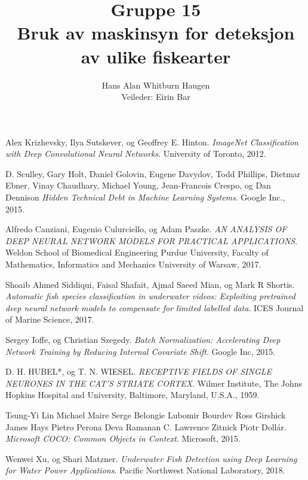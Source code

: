 \documentclass[11ot]{article}
\title{Gruppe 15\\Bruk av maskinsyn for deteksjon av ulike fiskearter}
\author{Hans Alan Whitburn Haugen\\Veileder: Eirin Bar}
\begin{document}

\newpage

\newpage

\newpage

\tableofcontents
\clearpage
{}
\setcounter{page}{1}








\begin{thebibliography}{9}


Alex Krizhevsky, Ilya Sutskever, og Geoffrey E. Hinton. 
\textit{ImageNet Classification with Deep Convolutional Neural Networks}. 
University of Toronto, 2012.

D. Sculley, Gary Holt, Daniel Golovin, Eugene Davydov, Todd Phillips, Dietmar Ebner, Vinay Chaudhary, Michael Young, Jean-Francois Crespo, og Dan Dennison 
\textit{Hidden Technical Debt in Machine Learning Systems}. 
Google Inc., 2015.

Alfredo Canziani, Eugenio Culurciello, og Adam Paszke. 
\textit{AN ANALYSIS OF DEEP NEURAL NETWORK MODELS FOR PRACTICAL APPLICATIONS}. 
Weldon School of Biomedical Engineering Purdue University, Faculty of Mathematics, Informatics and Mechanics University of Warsaw, 2017.

Shoaib Ahmed Siddiqui, Faisal Shafait, Ajmal Saeed Mian, og Mark R Shortis. 
\textit{Automatic fish species classification in underwater videos: Exploiting pretrained deep neural network models to compensate for limited labelled data}. 
ICES Journal of Marine Science, 2017.

Sergey Ioffe, og Christian Szegedy. 
\textit{Batch Normalization: Accelerating Deep Network Training by Reducing Internal Covariate Shift}. 
Google Inc, 2015.

D. H. HUBEL*, og T. N. WIESEL. 
\textit{RECEPTIVE FIELDS OF SINGLE NEURONES IN THE CAT'S STRIATE CORTEX}. 
 Wilmer Institute, The Johns Hopkins Hospital and University, Baltimore, Maryland, U.S.A., 1959.

Tsung-Yi Lin Michael Maire Serge Belongie Lubomir Bourdev Ross Girshick James Hays Pietro Perona Deva Ramanan C. Lawrence Zitnick Piotr Dollár. 
\textit{Microsoft COCO: Common Objects in Context}. 
Microsoft, 2015.

Wenwei Xu, og Shari Matzner. 
\textit{Underwater Fish Detection using Deep Learning for Water Power Applications}. 
Pacific Northwest National Laboratory, 2018.


\end{thebibliography}
\end{document}
